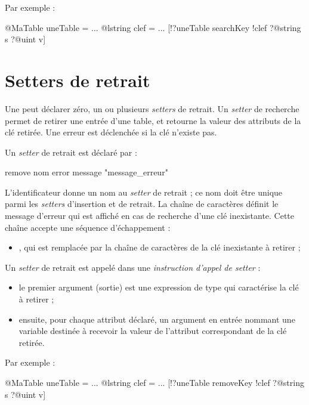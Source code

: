 Par exemple :
\begin{galgascode}
@MaTable uneTable = {}
...
@lstring clef = ...
[!?uneTable searchKey !clef ?@string s ?@uint v]
\end{galgascode}













\section{Setters de retrait}

Une  peut déclarer zéro, un ou plusieurs \emph{setters} de retrait. Un \emph{setter} de recherche permet de retirer une entrée d'une table, et retourne la valeur des attributs de la clé retirée. Une erreur est déclenchée si la clé n'existe pas.


Un \emph{setter} de retrait est déclaré par :

\begin{galgascode}
remove nom error message "message_erreur"
\end{galgascode}

L'identificateur  donne un nom au \emph{setter} de retrait ; ce nom doit être unique parmi les \emph{setters} d'insertion et de retrait. La chaîne de caractères  définit le message d'erreur qui est affiché en cas de recherche d'une clé inexistante. Cette chaîne accepte une séquence d'échappement :
\begin{itemize}
  \item {}, qui est remplacée par la chaîne de caractères de la clé inexistante à retirer ;
\end{itemize}


Un \emph{setter} de retrait est appelé dans une \emph{instruction d'appel de setter} :
\begin{itemize}
  \item le premier argument (sortie) est une expression de type  qui caractérise la clé à retirer ;
  \item ensuite, pour chaque attribut déclaré, un argument en entrée nommant une variable destinée à recevoir la valeur de l'attribut correspondant de la clé retirée.
\end{itemize}

Par exemple :
\begin{galgascode}
@MaTable uneTable = {}
...
@lstring clef = ...
[!?uneTable removeKey !clef ?@string s ?@uint v]
\end{galgascode}


